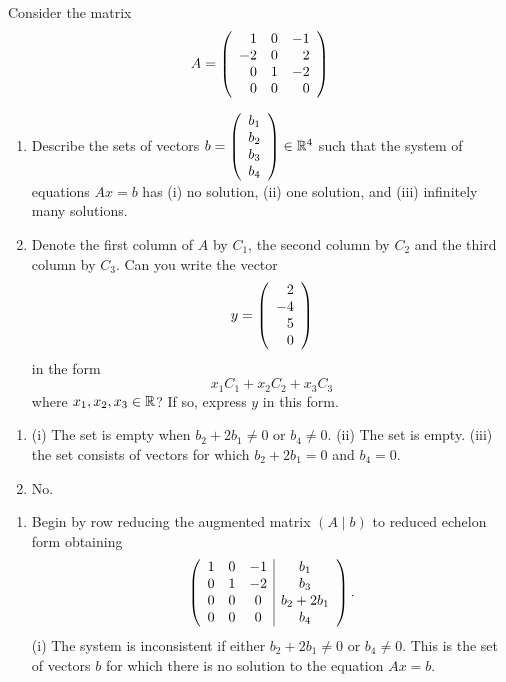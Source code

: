 \documentclass{ximera}
\author{Matthew Carr \& Martin Golubitsky}
\begin{document}
\begin{exercise}\label{mc.exerciseErr5}
Consider the matrix
\[
A=\left(\begin{array}{rrrrrrrrrrrrrrrrrr} 1 & 0 & -1 \\ -2 & 0 & 2 \\ 0 & 1 & -2 \\ 0 & 0 & 0 \end{array}\right)
\]
\begin{enumerate}[label=(\alph*)]
\item Describe the sets of vectors $b=\left(\begin{array}{rrrrrrrrrrrrrrrrrr} b_1\\b_2\\b_3\\b_4 \end{array}\right)\in\mathbb{R}^4$ such that the system of equations $Ax=b$ has (i) no solution, (ii) one solution, and (iii) infinitely many solutions.
\item Denote the first column of $A$ by $C_1$, the second column by $C_2$ and the third column by $C_3$.
Can you write the vector 
\[ 
y=\left(\begin{array}{rrrrrrrrrrrrrrrrrr} 2\\-4\\5 \\ 0 \end{array}\right)
\]
in the form 
\begin{equation} \label{e:linear_comb}
x_1 C_1 + x_2 C_2 + x_3 C_3
\end{equation}
where $x_1, x_2, x_3 \in\mbox{$\mathbb{R}$}$?  If so, express $y$ in this form.
\end{enumerate}


\begin{solution}

\ans\begin{enumerate}[label=(\alph*)]
\item (i) The set is empty when $b_2+2b_1\neq 0$ or $b_4\neq 0$. (ii) The set is empty.  (iii) the set consists of vectors for which $b_2+2b_1 = 0$ and $b_4 = 0$.
\item No.
\end{enumerate}

\soln

\begin{enumerate}[label=(\alph*)]
\item Begin by row reducing the augmented matrix $\left(A\mid b\right)$ to reduced echelon form obtaining
\[
\left(\begin{array}{ccc|c} 
1 & 0 & -1 & b_1 \\ 
0 & 1 & -2 & b_3 \\ 
0 & 0 & 0 & b_2+2b_1 \\ 
0 & 0 & 0 & b_4
\end{array}\right)\ldotp
\]
(i) The system is inconsistent if either $b_2+2b_1\neq 0$ or $b_4 \neq 0$. This is the set of vectors $b$ for which there is no solution to the equation $Ax=b$.


\end{enumerate}
\end{solution}
\end{exercise}
\end{document}
